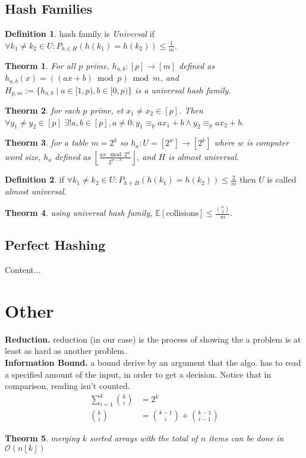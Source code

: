 \documentclass[]{article}
\newcommand\compactsubsection[1]        {\vspace{-10pt}\subsection{#1}\vspace{-5pt}}
\newcommand\compactsection   [1]        {\vspace{-10pt}\section{#1}\vspace{-5pt}}
\newcommand\E     {\mathbb{E}}
\newcommand\oc    {\mathcal{O}}
\newcommand\set   {\ell et \text{ }}
\newcommand\rf    {\right\rfloor}
\newcommand\lf    {\left\lfloor}
\newcommand\floor [1] {\lf #1 \rf}
\newcommand\co        {\colon}
\newtheorem{Theorem}{Theorm}
\theoremstyle{definition}
\newtheorem{Definition}{Definition}
\newcommand\theo  [1] {\begin{Theorem}#1\end{Theorem}}
\newcommand\defi  [1] {\begin{Definition}#1\end{Definition}}
\begin{document}
\begin{multicols}{4}
			\compactsubsection{Hash Families}
				\defi{hash family is \textit{Universal} if $\forall k_1 \neq k_2 \in U \co P_{h \in H}(h(k_1) = h(k_2)) \le \frac{1}{m}$. }
				\theo{For all $p$ prime, $h_{a, b} \co [p] \to [m]$ defined as $h_{a, b}(x) = ((ax + b) \bmod p)\bmod m$, and $H_{p, m} := \{h_{a, b} \mid a \in [1, p), b \in [0, p)\}$ is a universal hash family. }
				\theo{for each $p$ prime, \set $x_1 \neq x_2 \in [p]$. Then $\forall y_1 \neq y_2 \in [p]\,\, \exists ! a, b \in [p], a \neq 0 \co y_1 \equiv_p ax_1 + b \land y_2 \equiv_p ax_2 + b$. }
				\theo{for a table $m = 2^{k}$ so $h_a \co U = [2^{w}] \to [2^{k}]$ where $w$ is computer word size, $h_a$ defined as $\floor{\frac{ax \mod 2^{w}}{2^{w - k}}}$, and $H$ is almost universal. }
				\defi{if $\forall k_1 \neq k_2 \in U \co P_{h \in H}(h(k_1) = h(k_2)) \le \frac{2}{m}$ then $U$ is called \textit{almost universal}. }
				\theo{using universal hash family, $\E[\text{collisions}] \le \frac{\binom{n}{2}}{m}$. }
		
		
			\compactsubsection{Perfect Hashing}
			Content...
		
		
		\compactsection{Other}
		\textbf{Reduction. }reduction (in our case) is the process of showing the a problem is at least as hard as another problem. \\
		\textbf{Information Bound. }a bound derive by an argument that the algo. has to read a specified amount of the input, in order to get a decision. Notice that in comparison, reading isn't counted. 
		\begin{align*}
			\sum_{i = 1}^{k}\binom{k}{i} &= 2^{k} \\
			\binom{k}{i} &= \binom{k - 1}{i} + \binom{k - 1}{i - 1}
		\end{align*}
		\theo{merging $k$ sorted arrays with the total of $n$ items can be done in $\oc(n \floor{k})$}
		
	\end{multicols}
	
\end{document}
